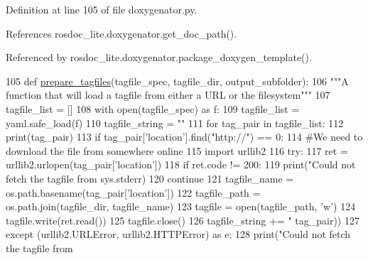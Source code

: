 Definition at line 105 of file doxygenator.\+py.



References rosdoc\+\_\+lite.\+doxygenator.\+get\+\_\+doc\+\_\+path().



Referenced by rosdoc\+\_\+lite.\+doxygenator.\+package\+\_\+doxygen\+\_\+template().


\begin{DoxyCode}
105 \textcolor{keyword}{def }\hyperlink{namespacerosdoc__lite_1_1doxygenator_a5ecf197ace49e2afdf49128d293739d8}{prepare\_tagfiles}(tagfile\_spec, tagfile\_dir, output\_subfolder):
106     \textcolor{stringliteral}{"""A function that will load a tagfile from either a URL or the filesystem"""}
107     tagfile\_list = []
108     with open(tagfile\_spec) \textcolor{keyword}{as} f:
109         tagfile\_list = yaml.safe\_load(f)
110     tagfile\_string = \textcolor{stringliteral}{""}
111     \textcolor{keywordflow}{for} tag\_pair \textcolor{keywordflow}{in} tagfile\_list:
112         print(tag\_pair)
113         \textcolor{keywordflow}{if} tag\_pair[\textcolor{stringliteral}{'location'}].find(\textcolor{stringliteral}{"http://"}) == 0:
114             \textcolor{comment}{#We need to download the file from somewhere online}
115             \textcolor{keyword}{import} urllib2
116             \textcolor{keywordflow}{try}:
117                 ret = urllib2.urlopen(tag\_pair[\textcolor{stringliteral}{'location'}])
118                 \textcolor{keywordflow}{if} ret.code != 200:
119                     print(\textcolor{stringliteral}{"Could not fetch the tagfile from %
      sys.stderr)
120                     \textcolor{keywordflow}{continue}
121                 tagfile\_name = os.path.basename(tag\_pair[\textcolor{stringliteral}{'location'}])
122                 tagfile\_path = os.path.join(tagfile\_dir, tagfile\_name)
123                 tagfile = open(tagfile\_path, \textcolor{stringliteral}{'w'})
124                 tagfile.write(ret.read())
125                 tagfile.close()
126                 tagfile\_string += \textcolor{stringliteral}{"%
      tag\_pair))
127             \textcolor{keywordflow}{except} (urllib2.URLError, urllib2.HTTPError) \textcolor{keyword}{as} e:
128                 print(\textcolor{stringliteral}{"Could not fetch the tagfile from %
}}}
\end{DoxyCode}
